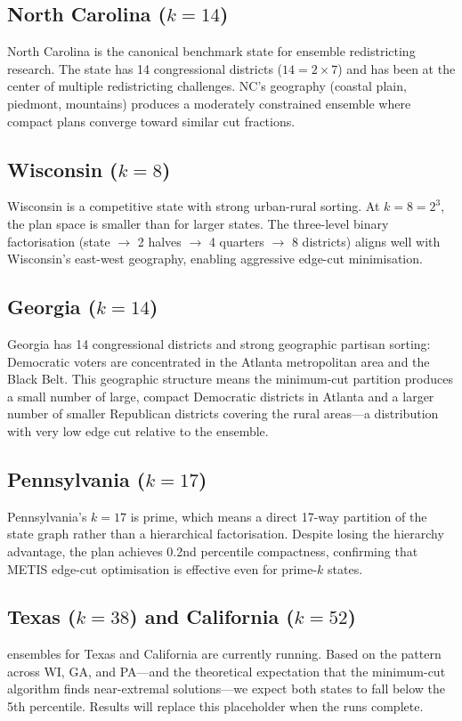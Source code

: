\subsection{North Carolina ($k = 14$)}

North Carolina is the canonical benchmark state for ensemble redistricting
research.  The state has 14 congressional districts ($14 = 2 \times 7$) and
has been at the center of multiple redistricting challenges.  NC's geography
(coastal plain, piedmont, mountains) produces a moderately constrained
ensemble where compact plans converge toward similar cut fractions.

\subsection{Wisconsin ($k = 8$)}

Wisconsin is a competitive state with strong urban-rural sorting.  At
$k = 8 = 2^3$, the plan space is smaller than for larger states.  The three-level
binary factorisation (state $\to$ 2 halves $\to$ 4 quarters $\to$ 8 districts)
aligns well with Wisconsin's east-west geography, enabling aggressive
edge-cut minimisation.

\subsection{Georgia ($k = 14$)}

Georgia has 14 congressional districts and strong geographic partisan sorting:
Democratic voters are concentrated in the Atlanta metropolitan area and the
Black Belt.  This geographic structure means the minimum-cut partition produces
a small number of large, compact Democratic districts in Atlanta and a larger
number of smaller Republican districts covering the rural areas---a distribution
with very low edge cut relative to the ensemble.

\subsection{Pennsylvania ($k = 17$)}

Pennsylvania's $k = 17$ is prime, which means a direct 17-way partition of the
state graph rather than a hierarchical factorisation.  Despite losing the
hierarchy advantage, the \ar{} plan achieves 0.2nd percentile compactness,
confirming that METIS edge-cut optimisation is effective even for prime-$k$
states.

\subsection{Texas ($k = 38$) and California ($k = 52$)}

\recom{} ensembles for Texas and California are currently running.  Based on
the pattern across WI, GA, and PA---and the theoretical expectation that the
minimum-cut algorithm finds near-extremal solutions---we expect both states to
fall below the 5th percentile.  Results will replace this placeholder when
the runs complete.
